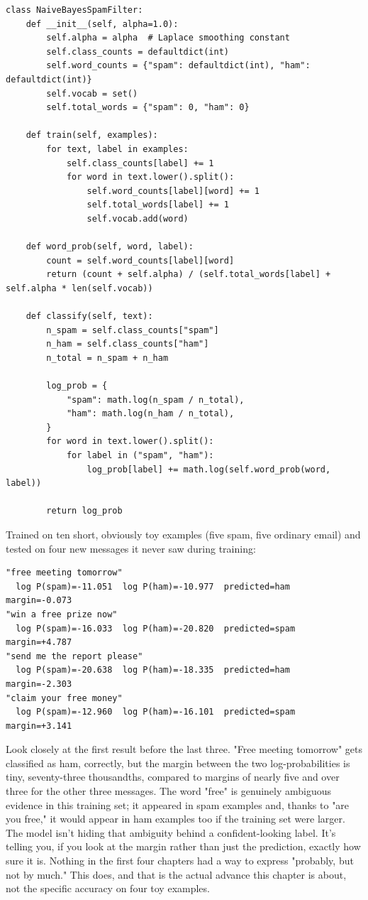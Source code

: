 \begin{Verbatim}[fontsize=\small, frame=single, xleftmargin=1em, xrightmargin=1em]
class NaiveBayesSpamFilter:
    def __init__(self, alpha=1.0):
        self.alpha = alpha  # Laplace smoothing constant
        self.class_counts = defaultdict(int)
        self.word_counts = {"spam": defaultdict(int), "ham": defaultdict(int)}
        self.vocab = set()
        self.total_words = {"spam": 0, "ham": 0}

    def train(self, examples):
        for text, label in examples:
            self.class_counts[label] += 1
            for word in text.lower().split():
                self.word_counts[label][word] += 1
                self.total_words[label] += 1
                self.vocab.add(word)

    def word_prob(self, word, label):
        count = self.word_counts[label][word]
        return (count + self.alpha) / (self.total_words[label] + self.alpha * len(self.vocab))

    def classify(self, text):
        n_spam = self.class_counts["spam"]
        n_ham = self.class_counts["ham"]
        n_total = n_spam + n_ham

        log_prob = {
            "spam": math.log(n_spam / n_total),
            "ham": math.log(n_ham / n_total),
        }
        for word in text.lower().split():
            for label in ("spam", "ham"):
                log_prob[label] += math.log(self.word_prob(word, label))

        return log_prob
\end{Verbatim}

Trained on ten short, obviously toy examples (five spam, five ordinary email) and tested on four new messages it never saw during training:

\begin{Verbatim}[fontsize=\small, frame=single, xleftmargin=1em, xrightmargin=1em]
"free meeting tomorrow"
  log P(spam)=-11.051  log P(ham)=-10.977  predicted=ham  margin=-0.073
"win a free prize now"
  log P(spam)=-16.033  log P(ham)=-20.820  predicted=spam  margin=+4.787
"send me the report please"
  log P(spam)=-20.638  log P(ham)=-18.335  predicted=ham  margin=-2.303
"claim your free money"
  log P(spam)=-12.960  log P(ham)=-16.101  predicted=spam  margin=+3.141
\end{Verbatim}

Look closely at the first result before the last three. "Free meeting tomorrow" gets classified as ham, correctly, but the margin between the two log-probabilities is tiny, seventy-three thousandths, compared to margins of nearly five and over three for the other three messages. The word "free" is genuinely ambiguous evidence in this training set; it appeared in spam examples and, thanks to "are you free," it would appear in ham examples too if the training set were larger. The model isn't hiding that ambiguity behind a confident-looking label. It's telling you, if you look at the margin rather than just the prediction, exactly how sure it is. Nothing in the first four chapters had a way to express "probably, but not by much." This does, and that is the actual advance this chapter is about, not the specific accuracy on four toy examples.

